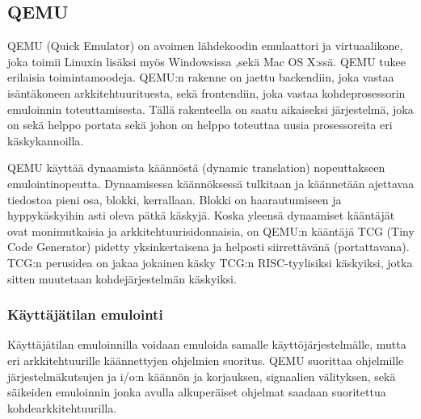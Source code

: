 \subsection{QEMU}
QEMU (Quick Emulator) on avoimen lähdekoodin emulaattori ja virtuaalikone, joka toimii Linuxin lisäksi myös Windowsissa ,sekä Mac OS X:ssä. QEMU tukee erilaisia toimintamoodeja. QEMU:n rakenne on jaettu backendiin, joka vastaa isäntäkoneen arkkitehtuurituesta, sekä frontendiin, joka vastaa kohdeprosessorin emuloinnin toteuttamisesta. Tällä rakenteella on saatu aikaiseksi järjestelmä, joka on sekä helppo portata sekä johon on helppo toteuttaa uusia prosessoreita eri käskykannoilla.

QEMU käyttää dynaamista käännöstä (dynamic translation) nopeuttakseen emulointinopeutta. Dynaamisessa käännöksessä tulkitaan ja käännetään ajettavaa tiedostoa pieni osa, blokki, kerrallaan. Blokki on haarautumiseen ja hyppykäskyihin asti oleva pätkä käskyjä. Koska yleensä dynaamiset kääntäjät ovat monimutkaisia ja arkkitehtuurisidonnaisia, on QEMU:n kääntäjä TCG (Tiny Code Generator) pidetty yksinkertaisena ja helposti siirrettävänä (portattavana). TCG:n perusidea on jakaa jokainen käsky TCG:n RISC-tyylisiksi käskyiksi, jotka sitten muutetaan kohdejärjestelmän käskyiksi.


\subsubsection{Käyttäjätilan emulointi}
Käyttäjätilan emuloinnilla voidaan emuloida samalle käyttöjärjestelmälle, mutta eri arkkitehtuurille käännettyjen ohjelmien suoritus. QEMU suorittaa ohjelmille järjestelmäkutsujen ja i/o:n käännön ja korjauksen, signaalien välityksen, sekä säikeiden emuloinnin jonka avulla alkuperäiset ohjelmat saadaan suoritettua kohdearkkitehtuurilla.

